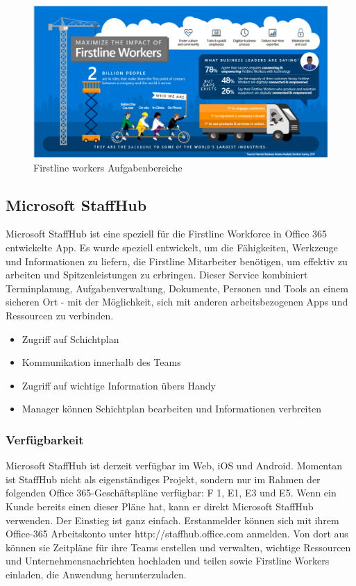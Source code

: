 \begin{figure}[H] 
\centering 
\includegraphics[scale=0.48]{images/frontlineworkers} 
\caption[Frontline Workers]{Firstline workers Aufgabenbereiche\protect} 
\label{dem} 
\end{figure}


\subsection{Microsoft StaffHub}

Microsoft StaffHub ist eine speziell für die Firstline Workforce in Office 365 entwickelte App. Es wurde speziell entwickelt, um die Fähigkeiten, Werkzeuge und Informationen zu liefern, die Firstline Mitarbeiter benötigen, um effektiv zu arbeiten und Spitzenleistungen zu erbringen. Dieser Service kombiniert Terminplanung, Aufgabenverwaltung, Dokumente, Personen und Tools an einem sicheren Ort - mit der Möglichkeit, sich mit anderen arbeitsbezogenen Apps und Ressourcen zu verbinden.
\begin{itemize}
\item Zugriff auf Schichtplan
\item Kommunikation innerhalb des Teams
\item Zugriff auf wichtige Information übers Handy
\item Manager können Schichtplan bearbeiten und Informationen verbreiten
\end{itemize}

\subsubsection{Verfügbarkeit}
Microsoft StaffHub ist derzeit verfügbar im Web, iOS und Android. Momentan ist StaffHub nicht als eigenständiges Projekt, sondern nur im Rahmen der folgenden Office 365-Geschäftspläne verfügbar: F 1, E1, E3 und E5. Wenn ein Kunde bereits einen dieser Pläne hat, kann er direkt Microsoft StaffHub verwenden. Der Einstieg ist ganz einfach. Erstanmelder können sich mit ihrem Office-365 Arbeitskonto unter http://staffhub.office.com anmelden. Von dort aus können sie Zeitpläne für ihre Teams erstellen und verwalten, wichtige Ressourcen und Unternehmensnachrichten hochladen und teilen sowie Firstline Workers einladen, die Anwendung herunterzuladen.

